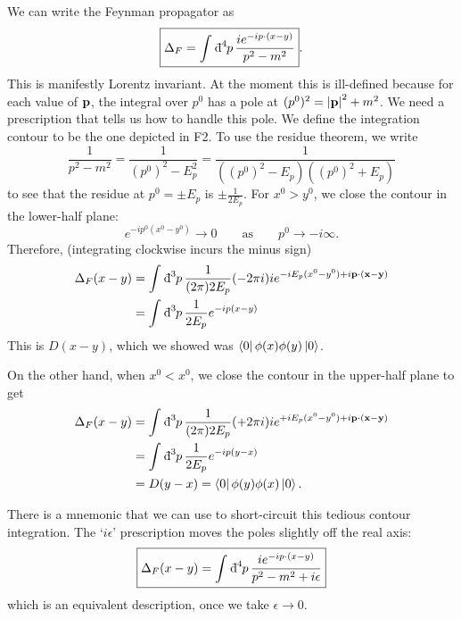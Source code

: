 \begin{claim}
  We can write the Feynman propagator as
  \begin{equation}
    \boxed{\Delta_F = \int_{}^{} \bdd[4]{p} \frac{ie^{-ip \cdot (x - y)}}{p^2 - m^2}}.
  \end{equation}
  This is manifestly Lorentz invariant.
  At the moment this is ill-defined because for each value of $\vb{p}$, the integral over $p^0$ has a pole at $(p^0)^2 = \abs{\vb{p}}^2 + m^2$. 
  We need a prescription that tells us how to handle this pole. We define the integration contour to be the one depicted in F2.
  To use the residue theorem, we write
  \begin{equation}
    \frac{1}{p^2 - m^2} = \frac{1}{(p^0)^2 - E_p^2} = \frac{1}{((p^0)^2 - E_p)((p^0)^2 + E_p)}
  \end{equation}
  to see that the residue at $p^0 = \pm E_p$ is $\pm \frac{1}{2 E_p}$.
  For $x^0 > y^0$, we close the contour in the lower-half plane:
  \begin{equation}
    e^{-i p^0 (x^0 - y^0)} \to 0 \qquad \text{as} \qquad p^0 \to -i \infty.
  \end{equation}
  Therefore, (integrating clockwise incurs the minus sign)
\begin{align}
  \Delta_F(x - y) &= \int_{}^{} \bdd[3]{p} \frac{1}{(2\pi) 2 E_p} (- 2\pi i) i e^{-i E_p (x^0 - y^0) + i \vb{p} \cdot (\vb{x} - \vb{y} )} \\
		  &= \int_{}^{} \bdd[3]{p} \frac{1}{2E_p} e^{-i p (x - y)}
  \end{align}
    This is $D(x - y)$, which we showed was $\bra{0} \phi(x) \phi(y) \ket{0}$.

    On the other hand, when $x^0 < x^0$, we close the contour in the upper-half plane to get 
  \begin{align}
    \Delta_F(x - y) &= \int_{}^{} \bdd[3]{p} \frac{1}{(2\pi) 2 E_p} (+ 2\pi i) i e^{+i E_p (x^0 - y^0) + i \vb{p} \cdot (\vb{x} - \vb{y} )} \\
		    &= \int_{}^{} \bdd[3]{p} \frac{1}{2E_p} e^{-i p (y - x)} \\
		    &= D(y - x) = \bra{0} \phi(y) \phi(x) \ket{0}.
  \end{align}
\end{claim}
There is a mnemonic that we can use to short-circuit this tedious contour integration.
The `$i \epsilon$' prescription moves the poles slightly off the real axis:
\begin{equation}
  \boxed{\Delta_F(x - y) = \int_{}^{} \bdd[4]{p} \frac{i e^{-i p \cdot (x - y)}}{p^2 - m^2 + i \epsilon}}
\end{equation}
which is an equivalent description, once we take $\epsilon \to 0$.

